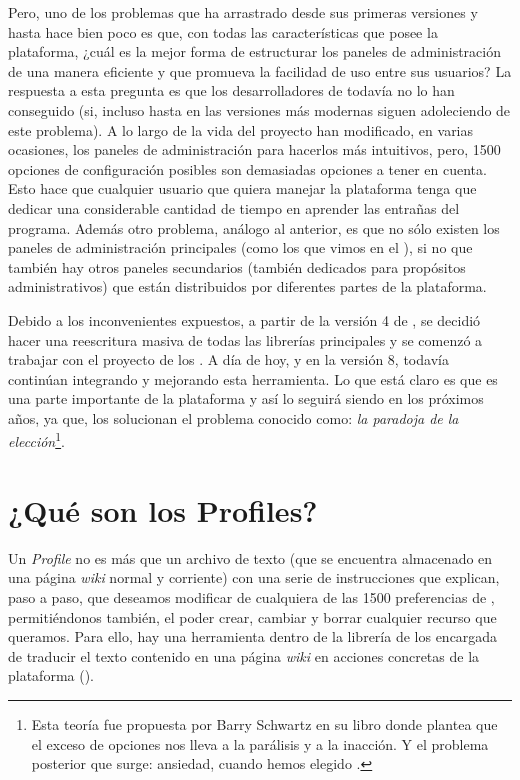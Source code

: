 Pero, uno de los problemas que ha arrastrado \tiki{} desde sus primeras versiones y hasta hace bien poco es que, con todas las características que posee la plataforma, ¿cuál es la mejor forma de estructurar los paneles de administración de una manera eficiente y que promueva la facilidad de uso entre sus usuarios? La respuesta a esta pregunta es que los desarrolladores de \tiki{} todavía no lo han conseguido (si, incluso hasta en las versiones más modernas siguen adoleciendo de este problema). A lo largo de la vida del proyecto han modificado, en varias ocasiones, los paneles de administración para hacerlos más intuitivos, pero, 1500 opciones de configuración posibles son demasiadas opciones a tener en cuenta. Esto hace que cualquier usuario que quiera manejar la plataforma tenga que dedicar una considerable cantidad de tiempo en aprender las entrañas del programa. Además otro problema, análogo al anterior, es que no sólo existen los paneles de administración principales (como los que vimos en el ), si no que también hay otros paneles secundarios (también dedicados para propósitos administrativos) que están distribuidos por diferentes partes de la plataforma.

Debido a los inconvenientes expuestos, a partir de la versión 4 de \tiki{}, se decidió hacer una reescritura masiva de todas las librerías principales y se comenzó a trabajar con el proyecto de los \profiles{}. A día de hoy, y en la versión 8, todavía continúan integrando y mejorando esta herramienta. Lo que está claro es que es una parte importante de la plataforma y así lo seguirá siendo en los próximos años, ya que, los \profiles{} solucionan el problema conocido como: \textit{la paradoja de la elección}\footnote{Esta teoría fue propuesta por Barry Schwartz en su libro  donde plantea que el exceso de opciones nos lleva a la parálisis y a la inacción. Y el problema posterior que surge: ansiedad, cuando hemos elegido \cite{libro:la-paradoja-de-la-elección}.}.

\section{¿Qué son los Profiles?}

Un \textit{Profile} no es más que un archivo de texto (que se encuentra almacenado en una página \textit{wiki} normal y corriente) con una serie de instrucciones que explican, paso a paso, que deseamos modificar de cualquiera de las 1500 preferencias de \tiki{}, permitiéndonos también, el poder crear, cambiar y borrar cualquier recurso que queramos. Para ello, hay una herramienta dentro de la librería de los \profiles{} encargada de traducir el texto contenido en una página \textit{wiki} en acciones concretas de la plataforma ().

